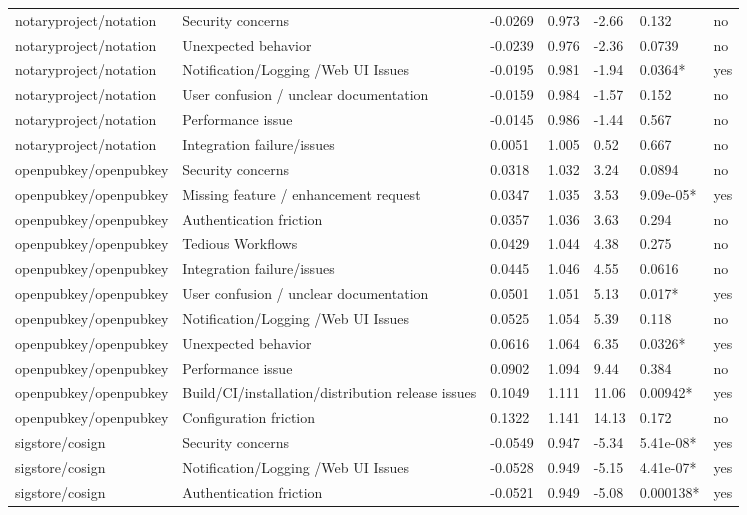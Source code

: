 \begin{table}[t]
\begin{tabular}{lllllll}
notaryproject/notation & Security concerns & -0.0269 & 0.973 & -2.66 & 0.132 & no \\
notaryproject/notation & Unexpected behavior & -0.0239 & 0.976 & -2.36 & 0.0739 & no \\
notaryproject/notation & Notification/Logging /Web UI Issues & -0.0195 & 0.981 & -1.94 & 0.0364* & yes \\
notaryproject/notation & User confusion / unclear documentation & -0.0159 & 0.984 & -1.57 & 0.152 & no \\
notaryproject/notation & Performance issue & -0.0145 & 0.986 & -1.44 & 0.567 & no \\
notaryproject/notation & Integration failure/issues & 0.0051 & 1.005 & 0.52 & 0.667 & no \\
openpubkey/openpubkey & Security concerns & 0.0318 & 1.032 & 3.24 & 0.0894 & no \\
openpubkey/openpubkey & Missing feature / enhancement request & 0.0347 & 1.035 & 3.53 & 9.09e-05* & yes \\
openpubkey/openpubkey & Authentication friction & 0.0357 & 1.036 & 3.63 & 0.294 & no \\
openpubkey/openpubkey & Tedious Workflows & 0.0429 & 1.044 & 4.38 & 0.275 & no \\
openpubkey/openpubkey & Integration failure/issues & 0.0445 & 1.046 & 4.55 & 0.0616 & no \\
openpubkey/openpubkey & User confusion / unclear documentation & 0.0501 & 1.051 & 5.13 & 0.017* & yes \\
openpubkey/openpubkey & Notification/Logging /Web UI Issues & 0.0525 & 1.054 & 5.39 & 0.118 & no \\
openpubkey/openpubkey & Unexpected behavior & 0.0616 & 1.064 & 6.35 & 0.0326* & yes \\
openpubkey/openpubkey & Performance issue & 0.0902 & 1.094 & 9.44 & 0.384 & no \\
openpubkey/openpubkey & Build/CI/installation/distribution release issues & 0.1049 & 1.111 & 11.06 & 0.00942* & yes \\
openpubkey/openpubkey & Configuration friction & 0.1322 & 1.141 & 14.13 & 0.172 & no \\
sigstore/cosign & Security concerns & -0.0549 & 0.947 & -5.34 & 5.41e-08* & yes \\
sigstore/cosign & Notification/Logging /Web UI Issues & -0.0528 & 0.949 & -5.15 & 4.41e-07* & yes \\
sigstore/cosign & Authentication friction & -0.0521 & 0.949 & -5.08 & 0.000138* & yes \\

\end{tabular}
\end{table}

